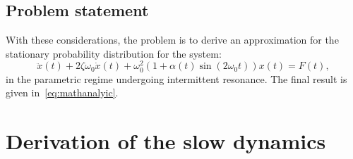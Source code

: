 \documentclass[3p]{elsarticle}
\begin{document}
 

\subsection*{Problem statement}
With these considerations, the problem is to derive an approximation for the stationary probability distribution for the system:
\begin{equation}\label{eq:problemstate_stoch_Mathieu}
    \ddot x(t) + 2 \zeta \omega_0 \dot x(t) +  \omega_0^2( 1  + \alpha(t) \sin( 2 \omega_0 t) )  x(t) =   F(t),
\end{equation}
in the parametric regime undergoing intermittent resonance. The final result  is  given in~\cref{eq:mathanalyic}.

\section{Derivation of the  slow dynamics}\label{sec:slow}
\end{document}
